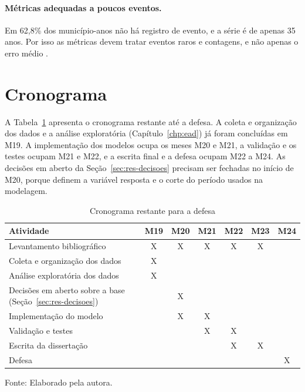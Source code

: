 \paragraph*{Métricas adequadas a poucos eventos.} Em 62,8\% dos município-anos não há registro de evento, e a série é de apenas 35 anos. Por isso as métricas devem tratar eventos raros e contagens, e não apenas o erro médio .

\section{Cronograma}
\label{sec:res-cronograma}

A Tabela~\ref{tab:cronograma} apresenta o cronograma restante até a defesa. A coleta e organização dos dados e a análise exploratória (Capítulo~\ref{chp:ead}) já foram concluídas em M19. A implementação dos modelos ocupa os meses M20 e M21, a validação e os testes ocupam M21 e M22, e a escrita final e a defesa ocupam M22 a M24. As decisões em aberto da Seção~\ref{sec:res-decisoes} precisam ser fechadas no início de M20, porque definem a variável resposta e o corte do período usados na modelagem.

\begin{table}[htbp]
\centering
\caption{Cronograma restante para a defesa}
\label{tab:cronograma}
\begin{tabular}{lcccccc}
\hline
Atividade & M19 & M20 & M21 & M22 & M23 & M24 \\
\hline
Levantamento bibliográfico & X & X & X & X & X & \\
Coleta e organização dos dados & X & & & & & \\
Análise exploratória dos dados & X & & & & & \\
Decisões em aberto sobre a base (Seção~\ref{sec:res-decisoes}) & & X & & & & \\
Implementação do modelo & & X & X & & & \\
Validação e testes & & & X & X & & \\
Escrita da dissertação & & & & X & X & \\
Defesa & & & & & & X \\
\hline
\end{tabular}
\par\small Fonte: Elaborado pela autora.
\end{table}

